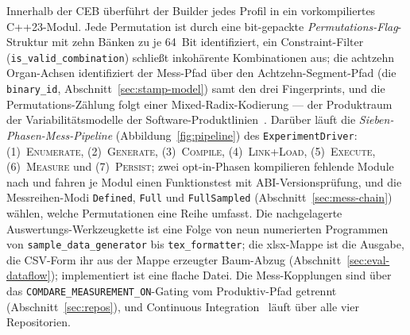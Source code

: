 \begin{nurkurz}
Innerhalb der CEB überführt der Builder jedes Profil in ein vorkompiliertes C++23-Modul. Jede Permutation
ist durch eine bit-gepackte \emph{Permutations-Flag}-Struktur mit zehn Bänken zu je 64~Bit identifiziert,
ein Constraint-Filter (\texttt{is\_valid\_combination}) schließt inkohärente Kombinationen aus; die
achtzehn Organ-Achsen identifiziert der Mess-Pfad über den Achtzehn-Segment-Pfad (die \texttt{binary\_id},
Abschnitt~\ref{sec:stamp-model}) samt den drei Fingerprints, und die Permutations-Zählung folgt einer
Mixed-Radix-Kodierung --- der Produktraum der Variabilitätsmodelle der
Software-Produktlinien~\cite{pohl2005spl}. Darüber läuft die \emph{Sieben-Phasen-Mess-Pipeline}
(Abbildung~\ref{fig:pipeline}) des \texttt{ExperimentDriver}: (1)~\textsc{Enumerate},
(2)~\textsc{Generate}, (3)~\textsc{Compile}, (4)~\textsc{Link+Load}, (5)~\textsc{Execute},
(6)~\textsc{Measure} und (7)~\textsc{Persist}; zwei opt-in-Phasen kompilieren fehlende Module nach und
fahren je Modul einen Funktionstest mit ABI-Versionsprüfung, und die Messreihen-Modi \texttt{Defined},
\texttt{Full} und \texttt{FullSampled} (Abschnitt~\ref{sec:mess-chain}) wählen, welche Permutationen eine
Reihe umfasst. Die nachgelagerte Auswertungs-Werkzeugkette ist eine Folge von neun numerierten Programmen
von \texttt{sample\_data\_generator} bis \texttt{tex\_formatter}; die xlsx-Mappe ist die Ausgabe, die
CSV-Form ihr aus der Mappe erzeugter Baum-Abzug (Abschnitt~\ref{sec:eval-dataflow}); implementiert ist
eine flache Datei. Die Mess-Kopplungen sind über das
\texttt{COMDARE\_\allowbreak{}MEASUREMENT\_\allowbreak{}ON}-Gating vom Produktiv-Pfad getrennt
(Abschnitt~\ref{sec:repos}), und Continuous Integration~\cite{fowler2006ci} läuft über alle vier
Repositorien.
\begin{figure}[htbp]\centering
\end{figure}
\end{nurkurz}

